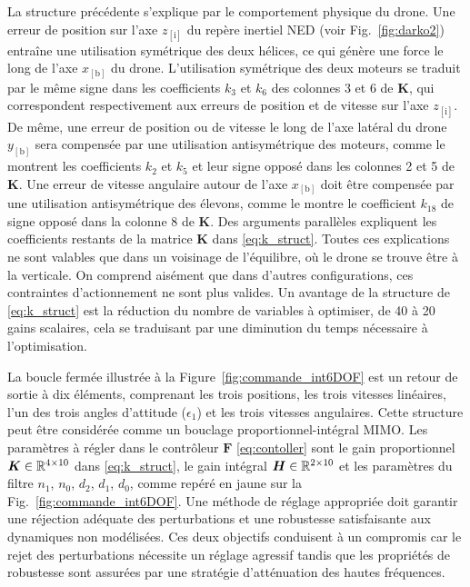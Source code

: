 La structure précédente s'explique par le comportement physique du drone. Une erreur de position sur l'axe $z_{[\text{i}]}$ du repère inertiel NED (voir Fig.~\ref{fig:darko2}) entraîne une utilisation symétrique des deux hélices, ce qui génère une force le long de l'axe $x_{[\text{b}]}$ du drone. L'utilisation symétrique des deux moteurs se traduit par le même signe dans les coefficients $k_{3}$ et $k_{6}$ des colonnes 3 et 6 de $\boldsymbol{K}$, qui correspondent respectivement aux erreurs de position et de vitesse sur l'axe $z_{[\text{i}]}$. De même, une erreur de position ou de vitesse le long de l'axe latéral du drone $y_{[\text{b}]}$ sera compensée par une utilisation antisymétrique des moteurs, comme le montrent les coefficients $k_{2}$ et $k_{5}$ et leur signe opposé dans les colonnes 2 et 5 de $\boldsymbol{K}$. Une erreur de vitesse angulaire autour de l'axe $x_{[\text{b}]}$ doit être compensée par une utilisation antisymétrique des élevons, comme le montre le coefficient $k_{18}$ de signe opposé dans la colonne 8 de $\boldsymbol{K}$. Des arguments parallèles expliquent les coefficients restants de la matrice $\boldsymbol{K}$ dans \eqref{eq:k_struct}. Toutes ces explications ne sont valables que dans un voisinage de l'équilibre, où le drone se trouve être à la verticale. On comprend aisément que dans d'autres configurations, ces contraintes d'actionnement ne sont plus valides. Un avantage de la structure de \eqref{eq:k_struct} est la réduction du nombre de variables à optimiser, de 40 à 20 gains scalaires, cela se traduisant par une diminution du temps nécessaire à l'optimisation.

La boucle fermée illustrée à la Figure~\ref{fig:commande_int6DOF} est un retour de sortie à dix éléments, comprenant les trois positions, les trois vitesses linéaires, l'un des trois angles d'attitude ($\epsilon_{1}$) et les trois vitesses angulaires. Cette structure peut être considérée comme un bouclage proportionnel-intégral MIMO. Les paramètres à régler dans le contrôleur $\boldsymbol{F}$ \eqref{eq:contoller} sont le gain proportionnel $\boldsymbol{K} \in {\mathbb R}^{4\times10}$ dans \eqref{eq:k_struct}, le gain intégral $\boldsymbol{H} \in {\mathbb R}^{2\times10}$ et les paramètres du filtre $n_1$, $n_0$, $d_2$, $d_1$, $d_0$, comme repéré en jaune sur la Fig.~\ref{fig:commande_int6DOF}. Une méthode de réglage appropriée doit garantir une réjection adéquate des perturbations et une robustesse satisfaisante aux dynamiques non modélisées. Ces deux objectifs conduisent à un compromis car le rejet des perturbations nécessite un réglage agressif tandis que les propriétés de robustesse sont assurées par une stratégie d'atténuation des hautes fréquences.


